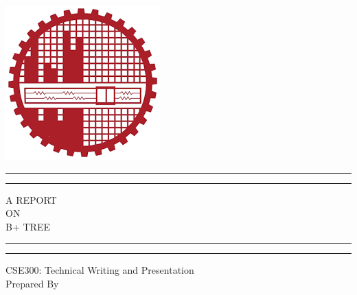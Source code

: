 \documentclass{article}
\begin{document}
    \begin{titlepage} %
    \begin{tcolorbox}[Baystyle]{
        \centering %
        \vspace*{4\baselineskip}
        \includegraphics[scale=0.15]{Images/BUET_LOGO.png}
	
	\scshape %
	
	\vspace*{3\baselineskip} %
	
	\rule{0.75\textwidth}{1.6pt}\vspace*{-\baselineskip}\vspace*{2pt} %
	\rule{0.75\textwidth}{0.4pt} %
	
	\vspace*{0.75\baselineskip} %
	
	{\LARGE A REPORT\\ ON\\ B+ TREE\\} %
	
	\vspace{0.75\baselineskip} %
	
	\rule{0.75\textwidth}{0.4pt}\vspace*{-\baselineskip}\vspace{3.2pt} %
	\rule{0.75\textwidth}{1.6pt} %
	
	\vspace{2\baselineskip} %
	CSE300: Technical Writing and Presentation\\ %
	\vspace*{5\baselineskip} %
	Prepared By
	
}
\end{tcolorbox}
\end{titlepage}
\end{document}
